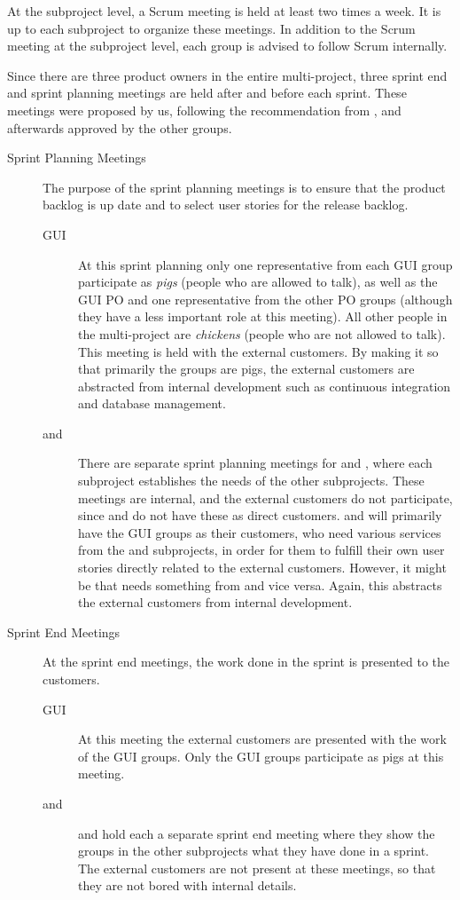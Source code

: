 At the subproject level, a Scrum meeting is held at least two times a week. It is up to each subproject to organize these meetings. In addition to the Scrum meeting at the subproject level, each group is advised to follow Scrum internally.

Since there are three product owners in the entire multi-project, three sprint end and sprint planning meetings are held after and before each sprint. These meetings were proposed by us, following the recommendation from \textcite{bird_davies_2007}, and afterwards approved by the other groups.

\begin{description}
  \item[Sprint Planning Meetings]
  The purpose of the sprint planning meetings is to ensure that the product backlog is up date and to select user stories for the release backlog.
  \begin{description}
    \item[GUI] At this sprint planning only one representative from each GUI group participate as \emph{pigs} (people who are allowed to talk), as well as the GUI PO and one representative from the other PO groups (although they have a less important role at this meeting). All other people in the multi-project are \emph{chickens} (people who are not allowed to talk). This meeting is held with the external customers. By making it so that primarily the \gui groups are pigs, the external customers are abstracted from internal development such as continuous integration and database management.
    \item[\db and \bd] There are separate sprint planning meetings for \db and \bd, where each subproject establishes the needs of the other subprojects. These meetings are internal, and the external customers do not participate, since \db and \bd do not have these as direct customers. \db and \bd will primarily have the GUI groups as their customers, who need various services from the \db and \bd subprojects, in order for them to fulfill their own user stories directly related to the external customers. However, it might be that \db needs something from \bd and vice versa. Again, this abstracts the external customers from internal development.
  \end{description}
  \item[Sprint End Meetings]
  At the sprint end meetings, the work done in the sprint is presented to the customers.
  \begin{description}
    \item[GUI] At this meeting the external customers are presented with the work of the GUI groups. Only the GUI groups participate as pigs at this meeting.
    \item[\db and \bd] \db and \bd hold each  a separate sprint end meeting where they show the groups in the other subprojects what they have done in a sprint. The external customers are not present at these meetings, so that they are not bored with internal details.
  \end{description}
\end{description}


